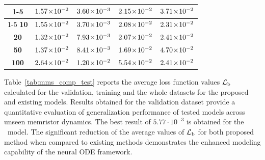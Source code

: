 \documentclass{ieeeaccess}
\begin{document}
\begin{table}
\begin{tabular}{c|cccc}
\cline{1-5}
\multicolumn{1}{|c|}{\textbf{5}} &  \(1.57 \!\times\! 10^{-2}\)  &  \color{ieeegreen} \bfseries \(3.60 \!\times\! 10^{-3}\)  &  \(2.15 \!\times\! 10^{-2}\)  & \multicolumn{1}{c|}{\color{ieeered} \bfseries \(3.71 \!\times\! 10^{-2}\) } \\
\cline{1-5}
\textbf{10} & \(1.55 \!\times\! 10^{-2}\) & \color{ieeegreen} \bfseries \(3.70 \!\times\! 10^{-3}\) & \(2.08 \!\times\! 10^{-2}\) & \color{ieeered} \bfseries \(2.31 \!\times\! 10^{-2}\) \\
\textbf{20} & \(1.32 \!\times\! 10^{-2}\) & \color{ieeegreen} \bfseries \(7.93 \!\times\! 10^{-3}\) & \(2.07 \!\times\! 10^{-2}\) & \color{ieeered} \bfseries \(2.41 \!\times\! 10^{-2}\) \\
\textbf{50} & \(1.37 \!\times\! 10^{-2}\) & \color{ieeegreen} \bfseries \(8.41 \!\times\! 10^{-3}\) & \(1.69 \!\times\! 10^{-2}\) & \color{ieeered} \bfseries \(4.70 \!\times\! 10^{-2}\) \\
\textbf{100} & \(2.64 \!\times\! 10^{-2}\) & \color{ieeegreen} \bfseries \(1.20 \!\times\! 10^{-2}\) & \color{ieeered} \bfseries \(5.54 \!\times\! 10^{-2}\) & \(2.41 \!\times\! 10^{-2}\) \\
    \bottomrule
  \end{tabular}
\end{table}

Table~\ref{tab:mms_comp_test} reports the average loss function values \(\mathcal{L}_{\text{b}}\) calculated for the validation, training and the whole datasets for the proposed and existing models. Results obtained for the validation dataset provide a quantitative evaluation of generalization performance of tested models across unseen memristor dynamics.
The best result of \(5.77 \cdot 10^{-3}\) is obtained for the \MemODETwo\ model. The significant reduction of the average values of \(\mathcal{L}_{\text{b}}\) for both proposed method when compared to existing methods demonstrates the enhanced modeling capability of the neural ODE framework.
\end{document}
